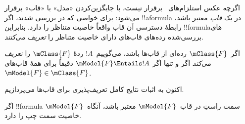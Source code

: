 \documentclass[../../../include/open-logic-section]{subfiles}
\begin{document}


اگرچه عکس استلزام‌های~ برقرار نیست، با
جایگزین‌کردن «مدل» با «قاب» برقرار می‌شود: برای خواصی که در
 بررسی شدند، اگر !!a{formula} در یک
\emph{قاب} معتبر باشد، رابطهٔ دسترسی آن قاب واقعاً خاصیت متناظر را
دارد. بنابراین !!{formula}های بررسی‌شده رده‌های قاب‌های دارای خاصیت
متناظر را \emph{تعریف می‌کنند}.

\begin{defn}
  اگر~$\mClass{F}$ رده‌ای از قاب‌ها باشد، می‌گوییم~$!A$ ردهٔ
  $\mClass{F}$ را \emph{تعریف می‌کند} اگر و تنها اگر
  $\mModel{F} \Entails !A$ دقیقاً برای همهٔ قاب‌های
  $\mModel{F} \in \mClass{F}$.
\end{defn}

اکنون به اثبات نتایج کامل تعریف‌پذیری برای قاب‌ها می‌پردازیم.

\begin{thm}
اگر !!{formula} سمت راستِ  در قاب~$\mModel{F}$
معتبر باشد، آنگاه~$\mModel{F}$ خاصیت سمت چپ را دارد.
\end{thm}
\end{document}
